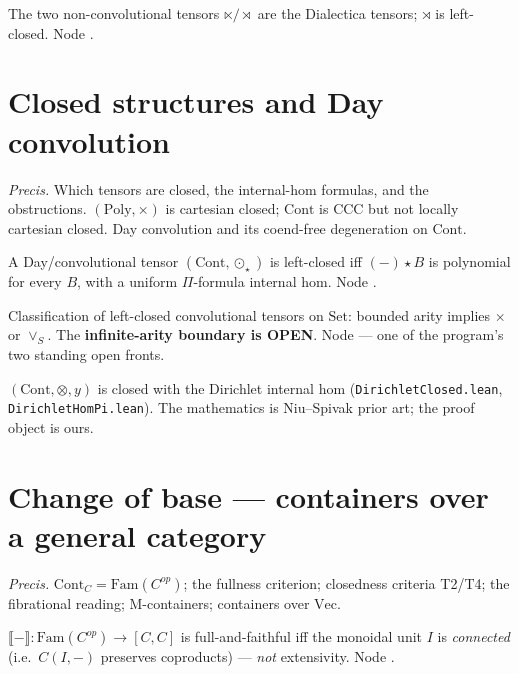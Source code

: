 \documentclass[11pt]{article}
\begin{document}
\begin{proposition}
The two non-convolutional tensors $⋉/⋊$ are the Dialectica tensors; $⋊$ is left-closed. Node
.
\end{proposition}

\section{Closed structures and Day convolution}
\emph{Precis.} Which tensors are closed, the internal-hom formulas, and the obstructions.
$(\mathrm{Poly},\times)$ is cartesian closed; $\mathrm{Cont}$ is CCC but not locally cartesian
closed. Day convolution and its coend-free degeneration on $\mathrm{Cont}$.

\begin{theorem}
A Day/convolutional tensor $(\mathrm{Cont},⊙_⋆)$ is left-closed iff $(-)⋆B$ is polynomial for
every $B$, with a uniform $Π$-formula internal hom. Node .
\end{theorem}

\begin{theorem}
Classification of left-closed convolutional tensors on $\mathrm{Set}$: bounded arity implies
$\times$ or $∨_S$. The \textbf{infinite-arity boundary is OPEN}. Node
 --- one of the program's two standing open fronts.
\end{theorem}

\begin{proposition}
$(\mathrm{Cont},\otimes,y)$ is closed with the Dirichlet internal hom (\texttt{DirichletClosed.lean},
\texttt{DirichletHomPi.lean}). The mathematics is Niu--Spivak prior art; the proof object is ours.
\end{proposition}

\section{Change of base --- containers over a general category}
\emph{Precis.} $\mathrm{Cont}_C=\mathrm{Fam}(C^{op})$; the fullness criterion; closedness criteria
T2/T4; the fibrational reading; M-containers; containers over $\mathrm{Vec}$.

\begin{theorem}
$⟦-⟧\colon\mathrm{Fam}(C^{op})\to[C,C]$ is full-and-faithful iff the monoidal unit $I$ is
\emph{connected} (i.e.\ $C(I,-)$ preserves coproducts) --- \emph{not} extensivity. Node
.
\end{theorem}
\end{document}
